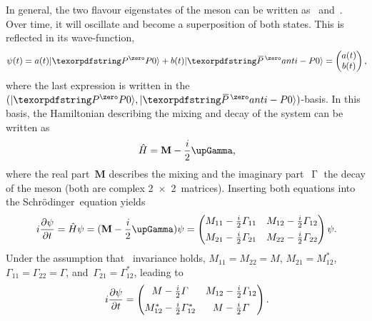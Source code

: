 In general, the two flavour eigenstates of the meson can be written as~\ket{\pz} and~\ket{\pzb}. Over time, it will oscillate and become a superposition of both states. This is reflected in its wave-function,
%
\begin{equation}
    \psi(t) = a(t)\ket{\pz} + b(t)\ket{\pzb} = \begin{pmatrix} a(t) \tabularnewline b(t) \end{pmatrix}\rlap{,}
\end{equation}
%
where the last expression is written in the \({(\ket{\pz}, \ket{\pzb})}\)-basis.
In this basis, the Hamiltonian describing the mixing and decay of the system can be written as
%
\begin{equation} \label{eqn:theory_Mixing_Hamiltonian}
    \hat{H} = \mathbf{M} - \dfrac{i}{2} \upGamma\rlap{,}
\end{equation}
%
where the real part~\(\mathbf{M}\) describes the mixing and the imaginary part~\(\upGamma\) the decay of the meson (both are complex \num{2x2}~matrices).
Inserting both equations into the Schrödinger~equation yields
%
\begin{equation}
    i \dfrac{\partial\psi}{\partial t} = \hat{H} \psi = (\mathbf{M} - \dfrac{i}{2} \upGamma) \psi =
        \begin{pmatrix}
            M_{11} - \frac{i}{2} \Gamma_{11} & M_{12} - \frac{i}{2} \Gamma_{12} \tabularnewline[1ex]
            M_{21} - \frac{i}{2} \Gamma_{21} & M_{22} - \frac{i}{2} \Gamma_{22}
        \end{pmatrix} \psi\rlap{.}
\end{equation}
%
Under the assumption that \CPT~invariance holds, \({M_{11} = M_{22} = M}\), \({M_{21} = M_{12}^{\ast}}\), \({\Gamma_{11} = \Gamma_{22} = \Gamma}\), and~\({\Gamma_{21} = \Gamma_{12}^{\ast}}\), leading to
%
\begin{equation} \label{eqn:Theory_Mixing_TimeDepHamiltonian}
    i \dfrac{\partial\psi}{\partial t} =
        \begin{pmatrix}
            M - \frac{i}{2} \Gamma & M_{12} - \frac{i}{2} \Gamma_{12} \tabularnewline[1ex]
            M_{12}^{\ast} - \frac{i}{2} \Gamma_{12}^{\ast} & M - \frac{i}{2} \Gamma
        \end{pmatrix}\rlap{.}
\end{equation}

